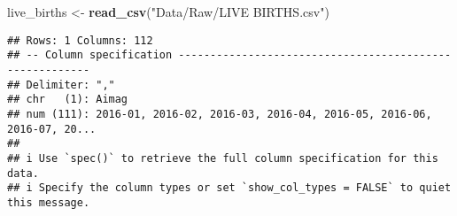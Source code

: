 \documentclass[
]{article}
\newenvironment{Shaded}{\begin{snugshade}}{\end{snugshade}}
\newcommand{\FunctionTok}[1]{\textcolor[rgb]{0.13,0.29,0.53}{\textbf{#1}}}
\newcommand{\NormalTok}[1]{#1}
\newcommand{\OtherTok}[1]{\textcolor[rgb]{0.56,0.35,0.01}{#1}}
\newcommand{\StringTok}[1]{\textcolor[rgb]{0.31,0.60,0.02}{#1}}
\begin{document}
\begin{Shaded}
\begin{Highlighting}[]
\NormalTok{live\_births      }\OtherTok{\textless{}{-}} \FunctionTok{read\_csv}\NormalTok{(}\StringTok{"Data/Raw/LIVE BIRTHS.csv"}\NormalTok{)}
\end{Highlighting}
\end{Shaded}

\begin{verbatim}
## Rows: 1 Columns: 112
## -- Column specification --------------------------------------------------------
## Delimiter: ","
## chr   (1): Aimag
## num (111): 2016-01, 2016-02, 2016-03, 2016-04, 2016-05, 2016-06, 2016-07, 20...
## 
## i Use `spec()` to retrieve the full column specification for this data.
## i Specify the column types or set `show_col_types = FALSE` to quiet this message.
\end{verbatim}
\end{document}

